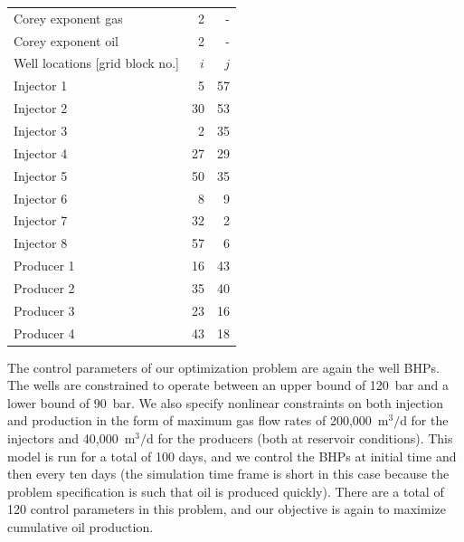 \documentclass[twocolumn,numbook]{svjour3}          %
\begin{document}
\begin{table}
\begin{tabular}{|l|rr|}
Corey exponent gas       & 2 & -                             \\
Corey exponent oil       & 2 & -                             \\
      \hline\hline
Well locations [grid block no.] & $i$ & $j$                      \\
\hline
Injector 1               &  5 &  57                          \\
Injector 2               &  30&  53                          \\
Injector 3               &   2&  35                          \\
Injector 4               &  27&  29                          \\
Injector 5               &  50&  35                          \\
Injector 6               &   8&   9                          \\
Injector 7               &  32&   2                          \\
Injector 8               &  57&   6                          \\
Producer 1               &  16&  43                          \\
Producer 2               &  35&  40                          \\
Producer 3               &  23&  16                          \\
Producer 4               &  43&  18                          \\
\hline
\end{tabular}
\label{table:VanEssenModelReservoir}
\end{table}


The control parameters of our optimization problem are again the well BHPs.  The
wells are constrained to operate between an upper bound of 120~bar and a lower
bound of 90~bar. We also specify nonlinear constraints on both injection and
production in the form of maximum gas flow
rates of 200,000~m$^3/$d for the injectors and 40,000~m$^3/$d for the producers
(both at reservoir conditions). This model is run for a total of 100 days, and
we control the BHPs at initial time and then every ten days (the simulation time
frame is short in this case because the problem specification is such that oil
is produced quickly). There are a total of 120 control parameters in this
problem, and our objective is again to maximize cumulative oil production.
\end{document}
